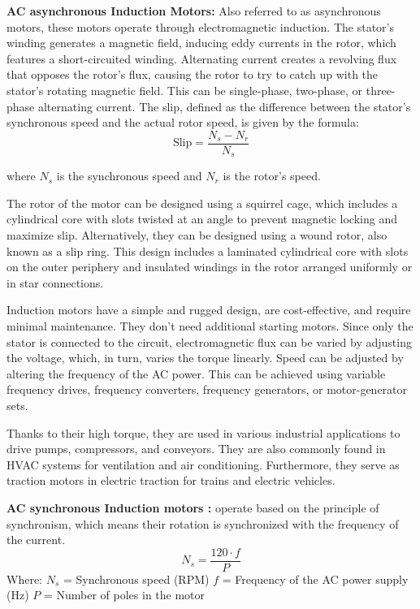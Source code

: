 \documentclass{article}
\begin{document}
\begin{flushleft}
 \textbf{ AC asynchronous Induction Motors:} Also referred to as asynchronous motors, these motors operate through electromagnetic induction. The stator's winding generates a magnetic field, inducing eddy currents in the rotor, which features a short-circuited winding. Alternating current creates a revolving flux that opposes the rotor's flux, causing the rotor to try to catch up with the stator's rotating magnetic field. This can be single-phase, two-phase, or three-phase alternating current. The slip, defined as the difference between the stator's synchronous speed and the actual rotor speed, is given by the formula:
\[ \text{Slip} = \frac{{N_s - N_r}}{{N_s}} \]

where \( N_s \) is the synchronous speed and \( N_r \) is the rotor's speed.

The rotor of the motor can be designed using a squirrel cage, which includes a cylindrical core with slots twisted at an angle to prevent magnetic locking and maximize slip. Alternatively, they can be designed using a wound rotor, also known as a slip ring. This design includes a laminated cylindrical core with slots on the outer periphery and insulated windings in the rotor arranged uniformly or in star connections. \newline

Induction motors have a simple and rugged design, are cost-effective, and require minimal maintenance. They don't need additional starting motors. Since only the stator is connected to the circuit, electromagnetic flux can be varied by adjusting the voltage, which, in turn, varies the torque linearly. Speed can be adjusted by altering the frequency of the AC power. This can be achieved using variable frequency drives, frequency converters, frequency generators, or motor-generator sets. \newline

Thanks to their high torque, they are used in various industrial applications to drive pumps, compressors, and conveyors. They are also commonly found in HVAC systems for ventilation and air conditioning. Furthermore, they serve as traction motors in electric traction for trains and electric vehicles. \newline



\textbf{AC synchronous Induction motors :} operate based on the principle of synchronism, which means their rotation is synchronized with the frequency of the current. \newline
\[
N_s = \frac{120 \cdot f}{P}
\]
Where:
\(N_s\) = Synchronous speed (RPM)
\(f\) = Frequency of the AC power supply (Hz)
\(P\) = Number of poles in the motor


\end{flushleft}
\end{document}
